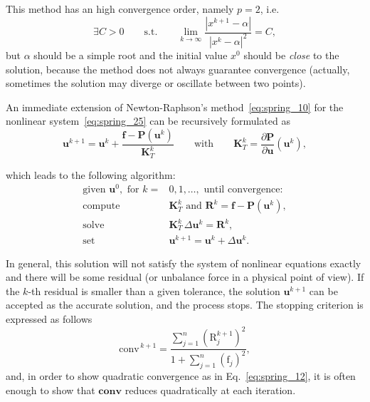 This method has an high convergence order, namely $p=2$, i.e.
\begin{equation}
\label{eq:spring_12}
\exists C>0\qquad\text{s.t.}\qquad \lim_{k\to\infty}\frac{\left| x^{k+1}-\alpha \right|}{\left| x^{k}-\alpha \right|^2}=C,
\end{equation}
but $\alpha$ should be a simple root and the initial value $x^0$ should be \emph{close} to the solution, because the method does not always guarantee convergence (actually, sometimes the solution may diverge or oscillate between two points). 

An immediate extension of Newton-Raphson’s method~\eqref{eq:spring_10} for the nonlinear system~\eqref{eq:spring_25} can be recursively formulated as
\begin{equation*}
\label{eq:spring_13}
\mathbf{u}^{k+1}=\mathbf{u}^k+\frac{ \mathbf{f}-\mathbf{P}(\mathbf{u}^k) }{\mathbf{K}_T^k}\qquad \text{with}\qquad \mathbf{K}_T^k=\frac{\partial\mathbf{P}}{\partial\mathbf{u}}(\mathbf{u}^k) ,
\end{equation*}

which leads to the following algorithm:
\begin{subequations}
\label{eq:spring_14}
\begin{align}
\text{given }\mathbf{u}^0,\text{ for }k=&0,1,\dots,\text{ until convergence:} \nonumber \\
\text{compute}\qquad&\mathbf{K}_T^k\text{ and } \mathbf{R}^k=\mathbf{f}-\mathbf{P}(\mathbf{u}^k) , \label{eq:spring_15} \\
\text{solve}\qquad &\mathbf{K}_T^k\,\Delta\mathbf{u}^k=\mathbf{R}^k , \label{eq:spring_16} \\
\text{set}\qquad&\mathbf{u}^{k+1}=\mathbf{u}^k+\Delta\mathbf{u}^k. \label{eq:spring_17}
\end{align}
\end{subequations}

In general, this solution will not satisfy the system of nonlinear equations exactly and there will be some residual (or unbalance force in a physical point of view). If the $k$-th residual is smaller than a given tolerance, the solution $\mathbf{u}^{k+1}$ can be accepted as the accurate solution, and the process stops. The stopping criterion is expressed as follows
\begin{equation}
\label{eq:spring_18}
\text{conv}^{\,k+1}=\frac{\displaystyle\sum_{j=1}^n\left( \text{R}_j^{k+1} \right)^2}{1+\displaystyle\sum_{j=1}^n\left( \text{f}_j \right)^2},
\end{equation}
and, in order to show quadratic convergence as in Eq.~\eqref{eq:spring_12}, it is often enough to show that $\textbf{conv}$ reduces quadratically at each iteration.

